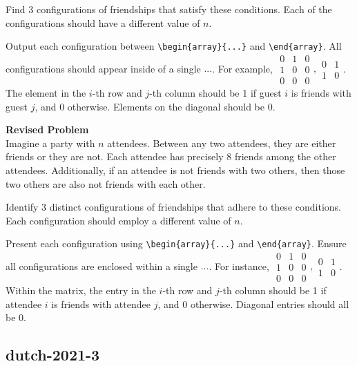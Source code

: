 Find $3$ configurations of friendships that satisfy these conditions. Each of the configurations should have a different value of $n$.

Output each configuration between \verb|\begin{array}{...}| and \verb|\end{array}|. All configurations should appear inside of a single $\boxed{...}$. For example, $\boxed{\begin{array}{ccc}0 & 1 & 0 \\ 1 & 0 & 0 \\ 0 & 0 & 0\end{array},\begin{array}{cc}0 & 1 \\ 1 & 0\end{array}}$.
The element in the $i$-th row and $j$-th column should be 1 if guest $i$ is friends with guest $j$, and 0 otherwise. Elements on the diagonal should be 0.

\textbf{Revised Problem}\\
Imagine a party with $n$ attendees. Between any two attendees, they are either friends or they are not. Each attendee has precisely 8 friends among the other attendees. Additionally, if an attendee is not friends with two others, then those two others are also not friends with each other.

Identify 3 distinct configurations of friendships that adhere to these conditions. Each configuration should employ a different value of $n$.

Present each configuration using \verb|\begin{array}{...}| and \verb|\end{array}|. Ensure all configurations are enclosed within a single $\boxed{...}$. For instance, $\boxed{\begin{array}{ccc}0 & 1 & 0 \\ 1 & 0 & 0 \\ 0 & 0 & 0\end{array},\begin{array}{cc}0 & 1 \\ 1 & 0\end{array}}$.
Within the matrix, the entry in the $i$-th row and $j$-th column should be 1 if attendee $i$ is friends with attendee $j$, and 0 otherwise. Diagonal entries should all be 0.

\subsection{dutch-2021-3}
